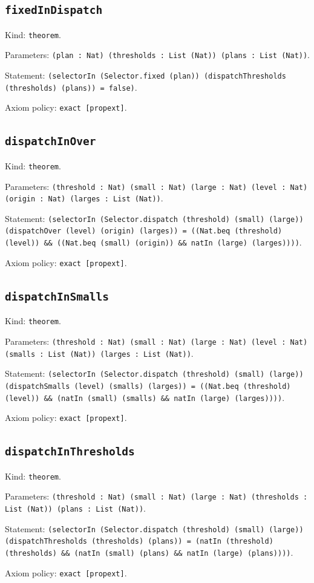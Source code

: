 \documentclass[11pt]{article}
\begin{document}
\subsection*{\texttt{fixedInDispatch}}
\noindent Kind: \texttt{theorem}.\par
\noindent Parameters: \texttt{(plan : Nat) (thresholds : List (Nat)) (plans : List (Nat))}.\par
\noindent Statement: \texttt{(selectorIn (Selector.fixed (plan)) (dispatchThresholds (thresholds) (plans)) = false)}.\par
\noindent Axiom policy: \texttt{exact [propext]}.\par
\subsection*{\texttt{dispatchInOver}}
\noindent Kind: \texttt{theorem}.\par
\noindent Parameters: \texttt{(threshold : Nat) (small : Nat) (large : Nat) (level : Nat) (origin : Nat) (larges : List (Nat))}.\par
\noindent Statement: \texttt{(selectorIn (Selector.dispatch (threshold) (small) (large)) (dispatchOver (level) (origin) (larges)) = ((Nat.beq (threshold) (level)) \&\& ((Nat.beq (small) (origin)) \&\& natIn (large) (larges))))}.\par
\noindent Axiom policy: \texttt{exact [propext]}.\par
\subsection*{\texttt{dispatchInSmalls}}
\noindent Kind: \texttt{theorem}.\par
\noindent Parameters: \texttt{(threshold : Nat) (small : Nat) (large : Nat) (level : Nat) (smalls : List (Nat)) (larges : List (Nat))}.\par
\noindent Statement: \texttt{(selectorIn (Selector.dispatch (threshold) (small) (large)) (dispatchSmalls (level) (smalls) (larges)) = ((Nat.beq (threshold) (level)) \&\& (natIn (small) (smalls) \&\& natIn (large) (larges))))}.\par
\noindent Axiom policy: \texttt{exact [propext]}.\par
\subsection*{\texttt{dispatchInThresholds}}
\noindent Kind: \texttt{theorem}.\par
\noindent Parameters: \texttt{(threshold : Nat) (small : Nat) (large : Nat) (thresholds : List (Nat)) (plans : List (Nat))}.\par
\noindent Statement: \texttt{(selectorIn (Selector.dispatch (threshold) (small) (large)) (dispatchThresholds (thresholds) (plans)) = (natIn (threshold) (thresholds) \&\& (natIn (small) (plans) \&\& natIn (large) (plans))))}.\par
\noindent Axiom policy: \texttt{exact [propext]}.\par
\end{document}
